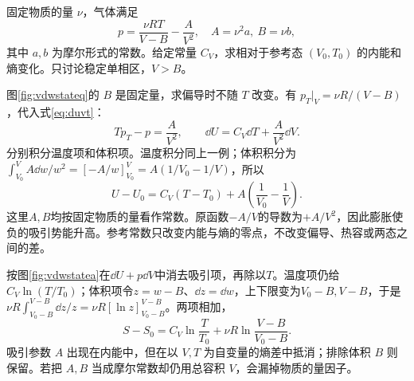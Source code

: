 \begin{example}\label{ex:vdwstate}
固定物质的量 $\nu$，气体满足
\[
 p=\frac{\nu RT}{V-B}-\frac A{V^2},\quad A=\nu^2a,\ B=\nu b,
\]
其中 $a,b$ 为摩尔形式的常数。给定常量 $C_V$，求相对于参考态 $(V_0,T_0)$ 的内能和熵变化。只讨论稳定单相区，$V>B$。
\end{example}
\begin{solution}
图\ref{fig:vdwstateq}的 $B$ 是固定量，求偏导时不随 $T$ 改变。有 $p_T|_V=\nu R/(V-B)$，代入式\eqref{eq:duvt}：
\[
 T p_T-p=\frac A{V^2},\qquad
 \dd U=C_V\dd T+\frac A{V^2}\dd V.
\]
分别积分温度项和体积项。温度积分同上一例；体积积分为$\int_{V_0}^{V}A\dd w/w^2=[-A/w]_{V_0}^{V}=A(1/V_0-1/V)$，所以
\[
 U-U_0=C_V(T-T_0)+A\left(\frac1{V_0}-\frac1V\right).
\]
这里$A,B$均按固定物质的量看作常数。原函数$-A/V$的导数为$+A/V^2$，因此膨胀使负的吸引势能升高。参考常数只改变内能与熵的零点，不改变偏导、热容或两态之间的差。

按图\ref{fig:vdwstatea}在$\dd U+p\dd V$中消去吸引项，再除以$T$。温度项仍给$C_V\ln(T/T_0)$；体积项令$z=w-B$、$\dd z=\dd w$，上下限变为$V_0-B,V-B$，于是$\nu R\int_{V_0-B}^{V-B}\dd z/z=\nu R[\ln z]_{V_0-B}^{V-B}$。两项相加，
\[
 S-S_0=C_V\ln\frac T{T_0}+\nu R\ln\frac{V-B}{V_0-B}.
\]
吸引参数 $A$ 出现在内能中，但在以 $V,T$ 为自变量的熵差中抵消；排除体积 $B$ 则保留。若把 $A,B$ 当成摩尔常数却仍用总容积 $V$，会漏掉物质的量因子。
\end{solution}


